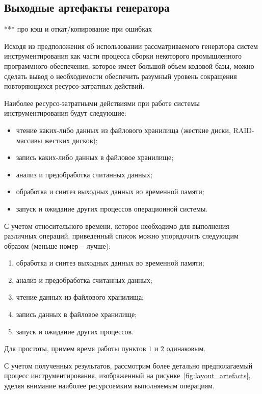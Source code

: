\subsection{Выходные артефакты генератора}

***
про кэш и откат/копирование при ошибках

Исходя из предположения об использовании рассматриваемого генератора систем инструментирования как части процесса сборки некоторого промышленного программного обеспечения, которое имеет большой объем кодовой базы, можно сделать вывод о необходимости обеспечить разумный уровень сокращения повторяющихся ресурсо-затратных действий.

Наиболее ресурсо-затратными действиями при работе системы инструментирования будут следующие:
\begin{itemize}[noitemsep]
  \item чтение каких-либо данных из файлового хранилища (жесткие диски, RAID-массивы жестких дисков);
  \item запись каких-либо данных в файловое хранилище;
  \item анализ и предобработка считанных данных;
  \item обработка и синтез выходных данных во временной памяти;
  \item запуск и ожидание других процессов операционной системы.
\end{itemize}

С учетом относительного времени, которое необходимо для выполнения различных операций, приведенный список можно упорядочить следующим образом (меньше номер -- лучше):
\begin{enumerate}[noitemsep]
  \item обработка и синтез выходных данных во временной памяти;
  \item анализ и предобработка считанных данных;
  \item чтение данных из файлового хранилища;
  \item запись данных в файловое хранилище;
  \item запуск и ожидание других процессов.
\end{enumerate}

Для простоты, примем время работы пунктов $1$ и $2$ одинаковым.

С учетом полученных результатов, рассмотрим более детально предполагаемый процесс инструментирования, изображенный на рисунке~\ref{fig:layout_artefacts}, уделяя внимание наиболее ресурсоемким выполняемым операциям.

